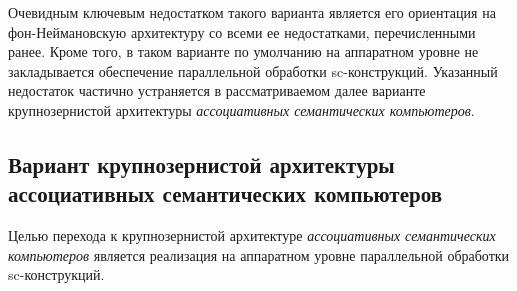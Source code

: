 Очевидным ключевым недостатком такого варианта является его ориентация на фон-Неймановскую архитектуру со всеми ее недостатками, перечисленными ранее. Кроме того, в таком варианте по умолчанию на аппаратном уровне не закладывается обеспечение параллельной обработки sc-конструкций. Указанный недостаток частично устраняется в рассматриваемом далее варианте крупнозернистой архитектуры \textit{ассоциативных семантических компьютеров}.

\subsection{Вариант крупнозернистой архитектуры ассоциативных семантических компьютеров}
\label{subsec_comp_coarse}

Целью перехода к крупнозернистой архитектуре \textit{ассоциативных семантических компьютеров} является реализация на аппаратном уровне параллельной обработки sc-конструкций.


